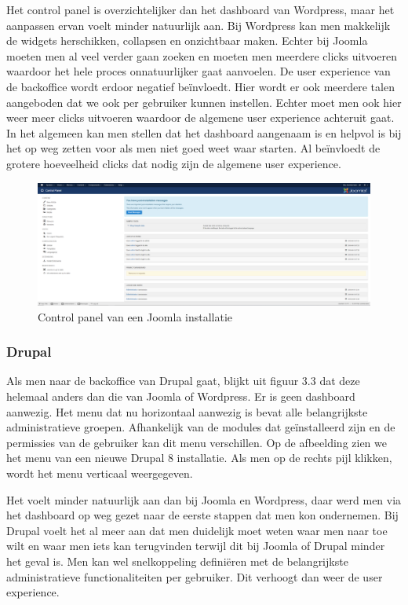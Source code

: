 Het control panel is overzichtelijker dan het dashboard van Wordpress, maar het aanpassen ervan voelt minder natuurlijk aan. Bij Wordpress kan men makkelijk de widgets herschikken, collapsen en onzichtbaar maken. Echter bij Joomla moeten men al veel verder gaan zoeken en moeten men meerdere clicks uitvoeren waardoor het hele proces onnatuurlijker gaat aanvoelen. De user experience van de backoffice wordt erdoor negatief beïnvloedt. Hier wordt er ook meerdere talen aangeboden dat we ook per gebruiker kunnen instellen. Echter moet men ook hier weer meer clicks uitvoeren waardoor de algemene user experience achteruit gaat. In het algemeen kan men stellen dat het dashboard aangenaam is en helpvol is bij het op weg zetten voor als men niet goed weet waar starten. Al beïnvloedt de grotere hoeveelheid clicks dat nodig zijn de algemene user experience.

\begin{figure}
    \centering
    \includegraphics[scale = 0.2]{img/Joomla_controlPanel.png}
    \caption{Control panel van een Joomla installatie}
    \label{fig:controlPanelJoomla}
\end{figure}
\subsubsection{Drupal}
Als men naar de backoffice van Drupal gaat, blijkt uit figuur 3.3 dat deze helemaal anders dan die van Joomla of Wordpress. Er is geen dashboard aanwezig. Het menu dat nu horizontaal aanwezig is bevat alle belangrijkste administratieve groepen. Afhankelijk van de modules dat geïnstalleerd zijn en de permissies van de gebruiker kan dit menu verschillen. Op de afbeelding zien we het menu van een nieuwe Drupal 8 installatie. Als men op de rechts pijl klikken, wordt het menu verticaal weergegeven.

Het voelt minder natuurlijk aan dan bij Joomla en Wordpress, daar werd men via het dashboard op weg gezet naar de eerste stappen dat men kon ondernemen. Bij Drupal voelt het al meer aan dat men duidelijk moet weten waar men naar toe wilt en waar men iets kan terugvinden terwijl dit bij Joomla of Drupal minder het geval is. Men kan wel snelkoppeling definiëren met de belangrijkste administratieve functionaliteiten per gebruiker. Dit verhoogt dan weer de user experience.

